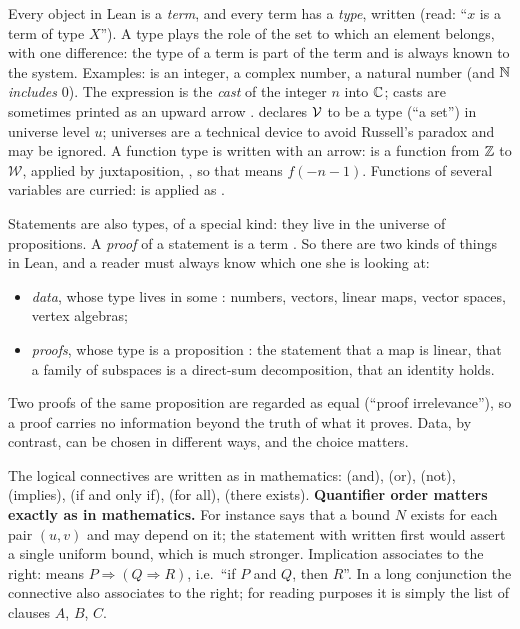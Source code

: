 Every object in Lean is a \emph{term}, and every term has a \emph{type}, written  (read:
``$x$ is a term of type $X$''). A type plays the role of the set to which an element belongs, with
one difference: the type of a term is part of the term and is always known to the system. Examples:
 is an integer,  a complex number,  a natural number (and
${\mathbb{N}}$ \emph{includes} $0$). The expression  is the \emph{cast} of the integer $n$ into
${\mathbb{C}}$; casts are sometimes printed as an upward arrow .  declares $\mathcal{V}$
to be a type (``a set'') in universe level $u$; universes are a technical device to avoid Russell's
paradox and may be ignored. A function type is written with an arrow:  is a
function from ${\mathbb{Z}}$ to $\mathcal W$, applied by juxtaposition, , so that 
means $f(-n-1)$. Functions of several variables are curried:  is applied as
.

Statements are also types, of a special kind: they live in the universe  of
propositions. A \emph{proof} of a statement  is a term . So there are two
kinds of things in Lean, and a reader must always know which one she is looking at:
\begin{itemize}
\item \emph{data}, whose type lives in some : numbers, vectors, linear maps, vector
  spaces, vertex algebras;
\item \emph{proofs}, whose type is a proposition : the statement that a map is
  linear, that a family of subspaces is a direct-sum decomposition, that an identity holds.
\end{itemize}
Two proofs of the same proposition are regarded as equal (``proof irrelevance''), so a proof
carries no information beyond the truth of what it proves. Data, by contrast, can be chosen in
different ways, and the choice matters.

The logical connectives are written as in mathematics:  (and),  (or),
 (not),  (implies),  (if and only if),  (for
all),  (there exists). \textbf{Quantifier order matters exactly as in mathematics.}
For instance  says that a bound $N$ exists
for each pair $(u,v)$ and may depend on it; the statement with  written first would assert
a single uniform bound, which is much stronger. Implication associates to the right:
 means $P\Rightarrow(Q\Rightarrow R)$, i.e.\ ``if $P$ and $Q$, then $R$''. In a long
conjunction  the connective also associates to the right; for reading purposes it is
simply the list of clauses $A$, $B$, $C$.



